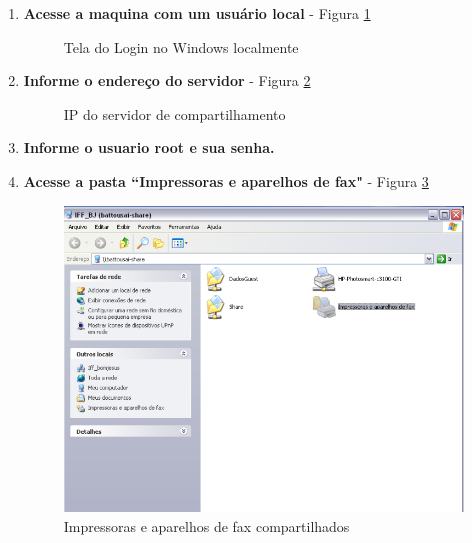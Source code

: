 \begin{enumerate}
	\item \textbf{Acesse a maquina com um usuário local} - Figura \ref{login_windows_local}
		\begin{figure}[ht]
		   	\centering
		   	\caption{Tela do Login no Windows localmente}
		    \label{login_windows_local}
		\end{figure}
		
	\item \textbf{Informe o endereço do servidor} - Figura \ref{server_ip}	
	\begin{figure}[ht]
	   	\centering
	   	\caption{IP do servidor de compartilhamento}
	    \label{server_ip}
	\end{figure}
		
\pagebreak
	
	\item \textbf{Informe o usuario root e sua senha.}	
	
	\item \textbf{Acesse a pasta ``Impressoras e aparelhos de fax"} - Figura \ref{impressora_aparelho_fax}
	\begin{figure}[ht]
	   	\centering
	    \includegraphics[width=0.7 \textwidth]{figuras/impressora_aparelho_fax}
	   	\caption{Impressoras e aparelhos de fax compartilhados}
	    \label{impressora_aparelho_fax}
	\end{figure}


\end{enumerate}

